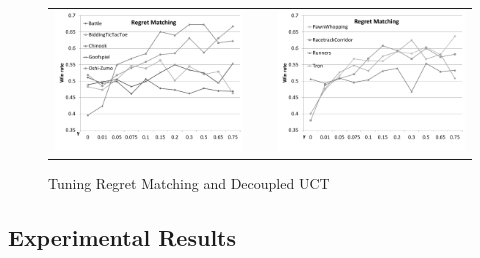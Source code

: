 \documentclass[conference]{IEEEtran}
\begin{document}
\begin{figure}[t!]
\begin{tabular}{ccc}
\hspace{-0.8cm}\includegraphics[scale=0.35]{figures/regretmatching1} & ~ & \includegraphics[scale=0.35]{figures/regretmatching2}\\
\end{tabular}
\caption{Tuning Regret Matching and Decoupled UCT}
\label{fig:tuning1}
\end{figure}


\subsection{Experimental Results}
\label{subsec:results}

\end{document}
